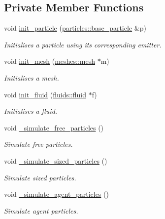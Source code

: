 \subsection*{Private Member Functions}
\begin{DoxyCompactItemize}
\item 
void \hyperlink{classphysim_1_1simulator_a55759abc6a93f89e3244bc16518c7fe4}{init\+\_\+particle} (\hyperlink{classphysim_1_1particles_1_1base__particle}{particles\+::base\+\_\+particle} \&p)
\begin{DoxyCompactList}\small\item\em Initialises a particle using its corresponding emitter. \end{DoxyCompactList}\item 
void \hyperlink{classphysim_1_1simulator_a5344fb7665e2f4c0e7930f7897f9a3bf}{init\+\_\+mesh} (\hyperlink{classphysim_1_1meshes_1_1mesh}{meshes\+::mesh} $\ast$m)
\begin{DoxyCompactList}\small\item\em Initialises a mesh. \end{DoxyCompactList}\item 
void \hyperlink{classphysim_1_1simulator_afc4f4dc27c302b5dd31824429d67104c}{init\+\_\+fluid} (\hyperlink{classphysim_1_1fluids_1_1fluid}{fluids\+::fluid} $\ast$f)
\begin{DoxyCompactList}\small\item\em Initialises a fluid. \end{DoxyCompactList}\item 
void \hyperlink{classphysim_1_1simulator_ae553797df3ee38cfe3c93bbc0b94be06}{\+\_\+simulate\+\_\+free\+\_\+particles} ()
\begin{DoxyCompactList}\small\item\em Simulate free particles. \end{DoxyCompactList}\item 
void \hyperlink{classphysim_1_1simulator_a04922992cda3b1c402da7041324c6049}{\+\_\+simulate\+\_\+sized\+\_\+particles} ()
\begin{DoxyCompactList}\small\item\em Simulate sized particles. \end{DoxyCompactList}\item 
void \hyperlink{classphysim_1_1simulator_a97eef0600da8870ee590babaffff775b}{\+\_\+simulate\+\_\+agent\+\_\+particles} ()
\begin{DoxyCompactList}\small\item\em Simulate agent particles. \end{DoxyCompactList}\item 

\end{DoxyCompactItemize}
